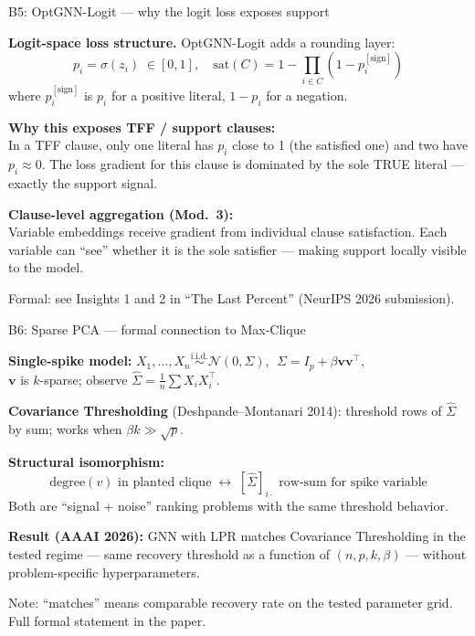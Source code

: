 \documentclass[aspectratio=169,10pt,dvipsnames]{beamer}
\begin{document}
\begin{frame}{B5: OptGNN-Logit — why the logit loss exposes support}

\textbf{Logit-space loss structure.} OptGNN-Logit adds a rounding layer:
\[
  p_i = \sigma(z_i) \;\in [0,1], \quad
  \mathrm{sat}(C) = 1 - \prod_{i\in C}(1-p_i^{[\text{sign}]})
\]
where $p_i^{[\text{sign}]}$ is $p_i$ for a positive literal, $1-p_i$ for a negation.

\medskip
\textbf{Why this exposes TFF / support clauses:}\\
In a TFF clause, only one literal has $p_i$ close to 1 (the satisfied one) and two have $p_i \approx 0$.
The loss gradient for this clause is dominated by the sole TRUE literal — exactly the support signal.

\medskip
\textbf{Clause-level aggregation (Mod.~3):}\\
Variable embeddings receive gradient from individual clause satisfaction. Each variable can ``see''
whether it is the sole satisfier — making support locally visible to the model.

\medskip\small
Formal: see Insights 1 and 2 in ``The Last Percent'' (NeurIPS 2026 submission).
\end{frame}

\begin{frame}{B6: Sparse PCA — formal connection to Max-Clique}

\textbf{Single-spike model:} $X_1,\ldots,X_n \overset{\text{i.i.d.}}{\sim} \mathcal{N}(0, \Sigma)$, $\;\Sigma = I_p + \beta \mathbf{v}\mathbf{v}^\top$,\\
$\mathbf{v}$ is $k$-sparse; observe $\hat\Sigma = \frac{1}{n}\sum X_i X_i^\top$.

\medskip
\textbf{Covariance Thresholding} (Deshpande–Montanari 2014): threshold rows of $\hat\Sigma$ by sum; works when $\beta k \gg \sqrt{p}$.

\medskip
\textbf{Structural isomorphism:}
\[
  \text{degree}(v) \text{ in planted clique} \;\longleftrightarrow\; [\hat\Sigma]_{i\cdot} \text{ row-sum for spike variable}
\]
Both are ``signal + noise'' ranking problems with the same threshold behavior.

\medskip
\textbf{Result (AAAI 2026):} GNN with LPR matches Covariance Thresholding in the tested regime — same recovery threshold as a function of $(n, p, k, \beta)$ — without problem-specific hyperparameters.

\medskip\small
Note: ``matches'' means comparable recovery rate on the tested parameter grid. Full formal statement in the paper.
\end{frame}
\end{document}

